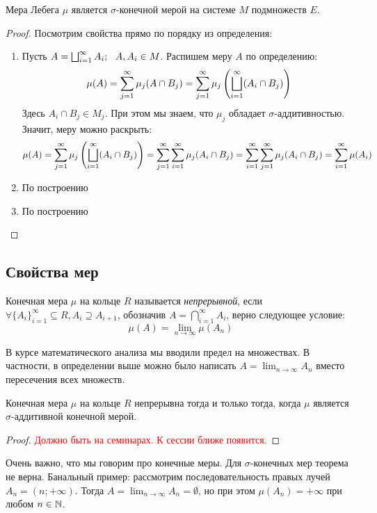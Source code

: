 \begin{theorem}
	Мера Лебега $\mu$ является $\sigma$-конечной мерой на системе $M$ подмножеств $E$.
\end{theorem}

\begin{proof}
	Посмотрим свойства прямо по порядку из определения:
	\begin{enumerate}
		\item Пусть $A = \bscup_{i = 1}^\infty A_i;\ \ A, A_i \in M$. Распишем меру $A$ по определению:
		\[
			\mu(A) = \sum_{j = 1}^\infty \mu_j(A \cap B_j) = \sum_{j = 1}^\infty \mu_j\left(\bigsqcup_{i = 1}^\infty (A_i \cap B_j)\right)
		\]
		Здесь $A_i \cap B_j \in M_j$. При этом мы знаем, что $\mu_j$ обладает $\sigma$-аддитивностью. Значит, меру можно раскрыть:
		\[
			\mu(A) = \sum_{j = 1}^\infty \mu_j\left(\bigsqcup_{i = 1}^\infty (A_i \cap B_j)\right) = \sum_{j = 1}^\infty \sum_{i = 1}^\infty \mu_j(A_i \cap B_j) = \sum_{i = 1}^\infty \sum_{j = 1}^\infty \mu_j(A_i \cap B_j) = \sum_{i = 1}^\infty \mu(A_i)
		\]
		
		\item По построению
		
		\item По построению
	\end{enumerate}
\end{proof}

\subsection*{Свойства мер}

\begin{definition}
	Конечная мера $\mu$ на кольце $R$ называется \textit{непрерывной}, если $\forall \{A_i\}_{i = 1}^\infty \subseteq R, A_i \supseteq A_{i + 1}$, обозначив $A = \bigcap_{i = 1}^\infty A_i$, верно следующее условие:
	\[
		\mu(A) = \lim_{n \to \infty} \mu(A_n)
	\]
\end{definition}

\begin{note}
	В курсе математического анализа мы вводили предел на множествах. В частности, в определении выше можно было написать $A = \lim_{n \to \infty} A_n$ вместо пересечения всех множеств.
\end{note}

\begin{theorem}
	Конечная мера $\mu$ на кольце $R$ непрерывна тогда и только тогда, когда $\mu$ является $\sigma$-аддитивной конечной мерой.
\end{theorem}

\begin{proof}
	\textcolor{red}{Должно быть на семинарах. К сессии ближе появится.}
\end{proof}

\begin{note}
	Очень важно, что мы говорим про конечные меры. Для $\sigma$-конечных мер теорема не верна. Банальный пример: рассмотрим последовательность правых лучей $A_n = (n; +\infty)$. Тогда $A = \lim_{n \to \infty} A_n = \emptyset$, но при этом $\mu(A_n) = +\infty$ при любом $n \in \mathbb{N}$.
\end{note}